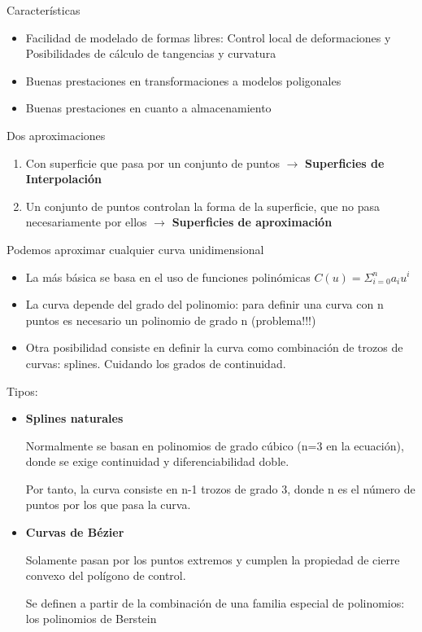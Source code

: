 \begin{itemize}
    Características
    \begin{itemize}
        \item Facilidad de modelado de formas libres: Control local de deformaciones y Posibilidades de cálculo de tangencias y curvatura
        \item Buenas prestaciones en transformaciones a modelos poligonales 
        \item Buenas prestaciones en cuanto a almacenamiento
    \end{itemize}
    Dos aproximaciones
    \begin{enumerate}
        \item Con superficie que pasa por un conjunto de puntos $\rightarrow$ \textbf{Superficies de Interpolación}
        \item Un conjunto de puntos controlan la forma de la superficie, que no pasa necesariamente por ellos $\rightarrow$ \textbf{Superficies de aproximación}
    \end{enumerate}
    Podemos aproximar cualquier curva unidimensional
    \begin{itemize}
        \item La más básica se basa en el uso de funciones polinómicas $C(u)=\Sigma^n_{i=0} a_iu^i$
        \item La curva depende del grado del polinomio: para definir una curva con n puntos es necesario un polinomio de grado n (problema!!!)
        \item Otra posibilidad consiste en definir la curva como combinación de trozos de curvas: splines. Cuidando los grados de continuidad.
    \end{itemize}
    Tipos:
    \begin{itemize}
        \item \textbf{Splines naturales} 
        
        Normalmente se basan en polinomios de grado cúbico (n=3 en la ecuación), donde se exige continuidad y diferenciabilidad doble.

        Por tanto, la curva consiste en n-1 trozos de grado 3, donde n es el número de puntos por los que pasa la curva.
        \item \textbf{Curvas de Bézier}
        
        Solamente pasan por los puntos extremos y cumplen la propiedad de cierre convexo del polígono de control.
        
        Se definen a partir de la combinación de una familia especial de polinomios: los polinomios de Berstein


\end{itemize}
\end{itemize}
